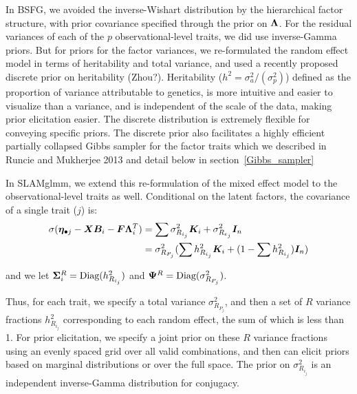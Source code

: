 \documentclass[11pt]{amsart}
\newcommand*{\B}[1]{\ifmmode\bm{#1}\else\textbf{#1}\fi}
\begin{document}
In BSFG, we avoided the inverse-Wishart distribution by the hierarchical factor structure, with prior covariance specified through the prior on $\B{\Lambda}$. For the residual variances of each of the $p$ observational-level traits, we did use inverse-Gamma priors. But for priors for the factor variances, we re-formulated the random effect model in terms of heritability and total variance, and used a recently proposed discrete prior on heritability (Zhou?). Heritability ($h^2 = \sigma^2_a / (\sigma^2_p)$) defined as the proportion of variance attributable to genetics, is more intuitive and easier to visualize than a variance, and is independent of the scale of the data, making prior elicitation easier. The discrete distribution is extremely flexible for conveying specific priors. The discrete prior also facilitates a highly efficient partially collapsed Gibbs sampler for the factor traits which we described in Runcie and Mukherjee 2013 and detail below in section~\ref{Gibbs_sampler}


In SLAMglmm, we extend this re-formulation of the mixed effect model to the observational-level traits as well. Conditional on the latent factors, the covariance of a single trait ($j$) is:
\begin{align} \begin{split}
\sigma(\B{\eta}_{\bullet j} - \B{X}\B{B}_i - \B{F}\B{\Lambda}^T_i)  &= \sum \sigma^2_{R_{i_j}} \B{K}_i + \sigma^2_{R_{e_j}}\B{I}_n \\
&= \sigma^2_{R_{P_j}} (\sum h^2_{R_{i_j}} \B{K}_i + (1 - \sum h^2_{R_{i_j}})\B{I}_n) 
\end{split} \end{align}

\noindent and we let $\B{\Sigma}^R_i = \mbox{Diag}(h^2_{R_{i_j}})$ and $\B{\Psi}^R = \mbox{Diag}(\sigma^2_{R_{P_j}})$.

Thus, for each trait, we specify a total variance $\sigma^2_{R_{P_j}}$, and then a set of $R$ variance fractions $h^2_{R_{i_j}}$ corresponding to each random effect, the sum of which is less than 1. For prior elicitation, we specify a joint prior on these $R$ variance fractions using an evenly spaced grid over all valid combinations, and then can elicit priors based on marginal distributions or over the full space. The prior on $\sigma^2_{R_{i_j}}$ is an independent inverse-Gamma distribution for conjugacy. 
\end{document}
